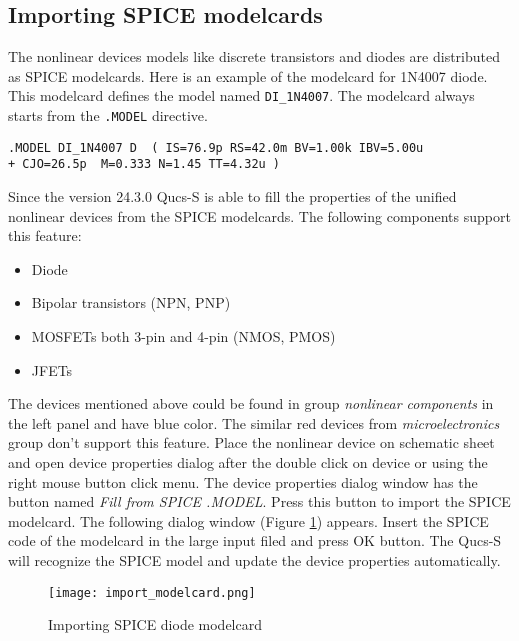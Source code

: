 \subsection{Importing SPICE modelcards}

The nonlinear devices models like discrete transistors and diodes are distributed as SPICE modelcards. Here is an example of the modelcard for 1N4007 diode. This modelcard defines the model named \verb|DI_1N4007|. The modelcard always starts from the \verb|.MODEL| directive.

\begin{verbatim}
.MODEL DI_1N4007 D  ( IS=76.9p RS=42.0m BV=1.00k IBV=5.00u
+ CJO=26.5p  M=0.333 N=1.45 TT=4.32u )
\end{verbatim}

Since the version 24.3.0 Qucs-S is able to fill the properties of the unified nonlinear devices from the SPICE modelcards. The following components support this feature:

\begin{itemize}
 \item Diode
 \item Bipolar transistors (NPN, PNP)
 \item MOSFETs both 3-pin and 4-pin (NMOS, PMOS)
 \item JFETs
\end{itemize}

The devices mentioned above could be found in group \emph{nonlinear components} in the left panel and have blue color. The similar red devices from \emph{microelectronics} group don't support this feature. Place the nonlinear device on schematic sheet and open device properties dialog after the double click on device or using the right mouse button click menu. The device properties dialog window has the button named \emph{Fill from SPICE .MODEL}. Press this button to import the SPICE modelcard. The following dialog window (Figure \ref{fig:spice_import}) appears. Insert the SPICE code of the modelcard in the large input filed and press OK button. The Qucs-S will recognize the SPICE model and update the device properties automatically.



    \begin{figure}[!ht]
    \begin{center}
        \texttt{[image: import\_modelcard.png]}
    \end{center}
    \caption{Importing SPICE diode modelcard} \label{fig:spice_import}
    \end{figure}

